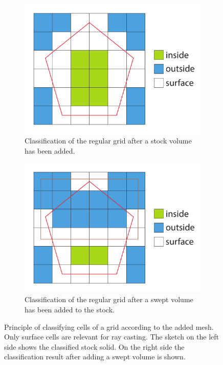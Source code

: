 \begin{figure}[h]
	\centering
	\begin{subfigure}[b]{0.4\textwidth}
		\includegraphics[width=\textwidth]{images/classification_before}
		\caption{Classification of the regular grid after a stock volume has been added.}
		\label{fig:classification_before}
	\end{subfigure}
	\begin{subfigure}[b]{0.4\textwidth}
		\includegraphics[width=\textwidth]{images/classification_after}
		\caption{Classification of the regular grid after a swept volume has been added to the stock.}
		\label{fig:classification_after}
	\end{subfigure}
	\caption{Principle of classifying cells of a grid according to the added mesh. Only surface cells are relevant for ray casting. The sketch on the left side shows the classified stock solid. On the right side the classification result after adding a swept volume is shown.}
	\label{fig:classification}
\end{figure}

